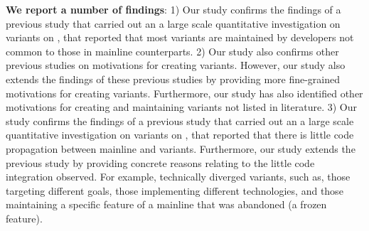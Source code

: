 \nd \textbf{We report a number of findings}: 1) Our study confirms the findings of a previous study that carried out an a large scale quantitative investigation on variants on \gh, that reported that most variants are maintained by developers not common to those in mainline counterparts. 2) Our study also confirms other previous studies on motivations for creating variants. However, our study also extends the findings of these previous studies by providing more fine-grained motivations for creating variants. Furthermore, our study has also identified other motivations for creating and maintaining variants not listed in literature. 3) Our study confirms the findings of a previous study that carried out an a large scale quantitative investigation on variants on \gh, that reported that there is little code propagation between mainline and variants. Furthermore, our study extends the previous study by providing concrete reasons relating to the little code integration observed. For example, technically diverged variants, such as, those targeting different goals, those implementing different technologies, and those maintaining a specific feature of a mainline that was abandoned (a frozen feature).

